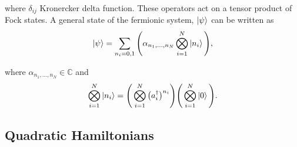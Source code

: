 \noi where $\delta_{ij}$ Kronercker delta function. These operators act on a tensor product of Fock states. A general state of the fermionic system, $\ket{\psi}$ can be written as
\begin{equation}
    \ket{\psi}=\sum_{n_{i}=0,1}\Bigg(\alpha_{n_{1},...,n_{N}}\bigotimes_{i=1}^{N}\ket{n_{i}}\Bigg),
\end{equation}

\noi where $\alpha_{n_{1},...,n_{N}}\in\mathbb{C}$ and
\begin{equation}
    \bigotimes_{i=1}^{N}\ket{n_{i}}=\Bigg(\bigotimes_{i=1}^{N}\big(a^{\dagger}_{i}\big)^{n_{i}}\Bigg)\Bigg(\bigotimes_{i=1}^{N}\ket{0}\Bigg).
\end{equation}

\subsection{Quadratic Hamiltonians}


